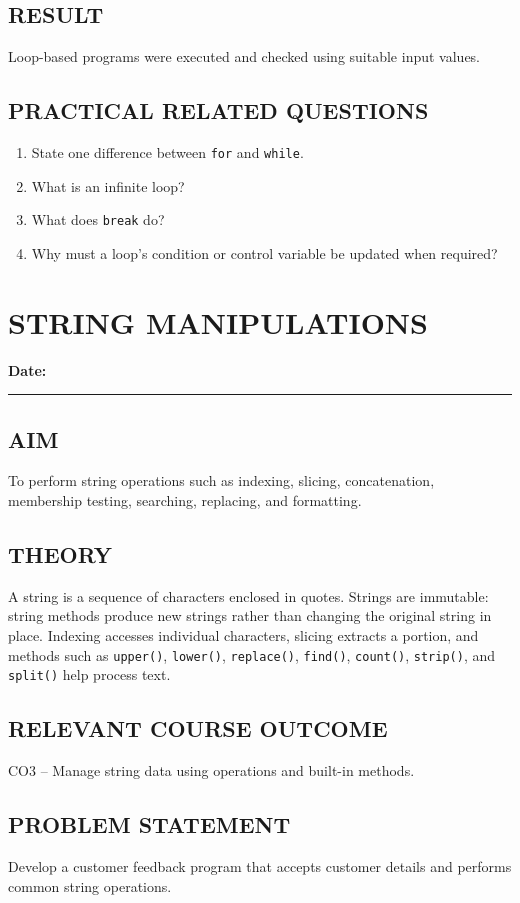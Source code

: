 \documentclass[12pt,a4paper]{report}
\newcommand{\experimentdate}{\hfill\textbf{Date:} \rule{3cm}{0.4pt}}
\newcommand{\aim}[1]{\section*{AIM}#1}
\newcommand{\result}[1]{\section*{RESULT}#1}
\newcommand{\courseoutcome}[1]{\section*{RELEVANT COURSE OUTCOME}#1}
\newcommand{\questions}[1]{\section*{PRACTICAL RELATED QUESTIONS}#1}
\begin{document}
\result{Loop-based programs were executed and checked using suitable input values.}

\questions{
\begin{enumerate}
\item State one difference between \texttt{for} and \texttt{while}.
\item What is an infinite loop?
\item What does \texttt{break} do?
\item Why must a loop's condition or control variable be updated when required?
\end{enumerate}}

\chapter{STRING MANIPULATIONS}
\experimentdate

\aim{To perform string operations such as indexing, slicing, concatenation, membership testing, searching, replacing, and formatting.}

\section*{THEORY}
A string is a sequence of characters enclosed in quotes. Strings are immutable:
string methods produce new strings rather than changing the original string in place.
Indexing accesses individual characters, slicing extracts a portion, and methods such
as \texttt{upper()}, \texttt{lower()}, \texttt{replace()}, \texttt{find()},
\texttt{count()}, \texttt{strip()}, and \texttt{split()} help process text.

\courseoutcome{CO3 -- Manage string data using operations and built-in methods.}

\section*{PROBLEM STATEMENT}
Develop a customer feedback program that accepts customer details and performs common string operations.
\end{document}
